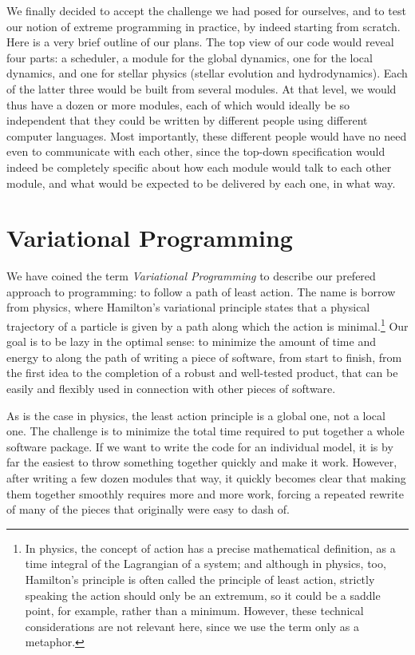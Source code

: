 We finally decided to accept the challenge we had posed for ourselves,
and to test our notion of extreme programming in practice, by indeed
starting from scratch.
Here is a very brief outline of our plans.  The top view of our code
would reveal four parts: a scheduler, a module for the global
dynamics, one for the local dynamics, and one for stellar physics
(stellar evolution and hydrodynamics).  Each of the latter three would
be built from several modules.  At that level, we would thus have a
dozen or more modules, each of which would ideally be so independent
that they could be written by different people using different
computer languages.  Most importantly, these different people would
have no need even to communicate with each other, since the top-down
specification would indeed be completely specific about how each
module would talk to each other module, and what would be expected to
be delivered by each one, in what way.

\section*{Variational Programming}

We have coined the term {\it Variational Programming} to describe our
prefered approach to programming: to follow a path of least action.
The name is borrow from physics, where Hamilton's variational
principle states that a physical trajectory of a particle is given by
a path along which the action is minimal.\footnote{
  In physics, the concept of action has a precise mathematical
  definition, as a time integral of the Lagrangian of a system; and
  although in physics, too, Hamilton's principle is often called the
  principle of least action, strictly speaking the action should only
  be an extremum, so it could be a saddle point, for example, rather
  than a minimum.  However, these technical considerations are not
  relevant here, since we use the term only as a metaphor.}
Our goal is to be lazy in the optimal sense: to minimize the amount of
time and energy to along the path of writing a piece of software, from
start to finish, \ie from the first idea to the completion of a robust
and well-tested product, that can be easily and flexibly used in
connection with other pieces of software.  

As is the case in physics, the least action principle is a global one,
not a local one.  The challenge is to minimize the total time required
to put together a whole software package.  If we want to write the
code for an individual model, it is by far the easiest to throw
something together quickly and make it work.  However, after writing a
few dozen modules that way, it quickly becomes clear that making them
together smoothly requires more and more work, forcing a repeated
rewrite of many of the pieces that originally were easy to dash of.

